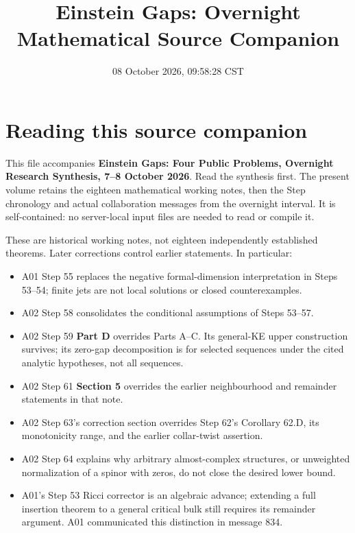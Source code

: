 \documentclass[
  10pt,
]{report}
\title{Einstein Gaps: Overnight Mathematical Source Companion}
\author{}
\date{08 October 2026, 09:58:28 CST}
\providecommand{\tightlist}{%
  \setlength{\itemsep}{0pt}\setlength{\parskip}{0pt}}
\begin{document}
\maketitle

{
\setcounter{tocdepth}{2}
\tableofcontents
}
\hypertarget{reading-this-source-companion}{%
\chapter{Reading this source
companion}\label{reading-this-source-companion}}

This file accompanies \textbf{Einstein Gaps: Four Public Problems,
Overnight Research Synthesis, 7--8 October 2026}. Read the synthesis
first. The present volume retains the eighteen mathematical working
notes, then the Step chronology and actual collaboration messages from
the overnight interval. It is self-contained: no server-local input
files are needed to read or compile it.

These are historical working notes, not eighteen independently
established theorems. Later corrections control earlier statements. In
particular:

\begin{itemize}
\tightlist
\item
  A01 Step 55 replaces the negative formal-dimension interpretation in
  Steps 53--54; finite jets are not local solutions or closed
  counterexamples.
\item
  A02 Step 58 consolidates the conditional assumptions of Steps 53--57.
\item
  A02 Step 59 \textbf{Part D} overrides Parts A--C. Its general-KE upper
  construction survives; its zero-gap decomposition is for selected
  sequences under the cited analytic hypotheses, not all sequences.
\item
  A02 Step 61 \textbf{Section 5} overrides the earlier neighbourhood and
  remainder statements in that note.
\item
  A02 Step 63's correction section overrides Step 62's Corollary 62.D,
  its monotonicity range, and the earlier collar-twist assertion.
\item
  A02 Step 64 explains why arbitrary almost-complex structures, or
  unweighted normalization of a spinor with zeros, do not close the
  desired lower bound.
\item
  A01's Step 53 Ricci corrector is an algebraic advance; extending a
  full insertion theorem to a general critical bulk still requires its
  remainder argument. A01 communicated this distinction in message 834.
\end{itemize}
\end{document}
